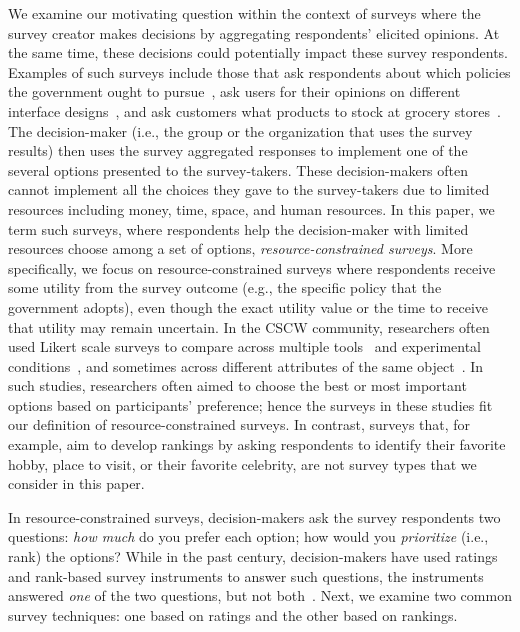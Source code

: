 {{We examine our motivating question within the context of surveys where the survey creator makes decisions by aggregating respondents' elicited opinions. At the same time, these decisions could potentially impact these survey respondents. Examples of such surveys include those that ask respondents about which policies the government ought to pursue~\cite{pew_spending}, ask users for their opinions on different interface designs~\cite{ledo2018evaluation}, and ask customers what products to stock at grocery stores~\cite{nielsen}. The decision-maker (i.e., the group or the organization that uses the survey results) then uses the survey aggregated responses to implement one of the several options presented to the survey-takers. These decision-makers often cannot implement all the choices they gave to the survey-takers due to limited resources including money, time, space, and human resources. In this paper, we term such surveys, where respondents help the decision-maker with limited resources choose among a set of options, \textit{resource-constrained surveys}. More specifically, we focus on resource-constrained surveys where respondents receive some utility from the survey outcome (e.g., the specific policy that the government adopts), even though the exact utility value or the time to receive that utility may remain uncertain. In the CSCW community, researchers often used Likert scale surveys to compare across multiple tools~\cite{zhang2017wikum} and experimental conditions~\cite{chang2017alpharead}, and sometimes across different attributes of the same object~\cite{cheng2017anyone, ma2017video}. In such studies, researchers often aimed to choose the best or most important options based on participants' preference; hence the surveys in these studies fit our definition of resource-constrained surveys. In contrast, surveys that, for example, aim to develop rankings by asking respondents to identify their favorite hobby, place to visit, or their favorite celebrity, are not survey types that we consider in this paper. 

In resource-constrained surveys, decision-makers ask the survey respondents two questions: \textit{how much} do you prefer each option; how would you \textit{prioritize} (i.e., rank) the options? While in the past century, decision-makers have used ratings and rank-based survey instruments to answer such questions, the instruments answered \emph{one} of the two questions, but not both~\cite{moors2016two}.  Next, we examine two common survey techniques: one based on ratings and the other based on rankings.

}}
